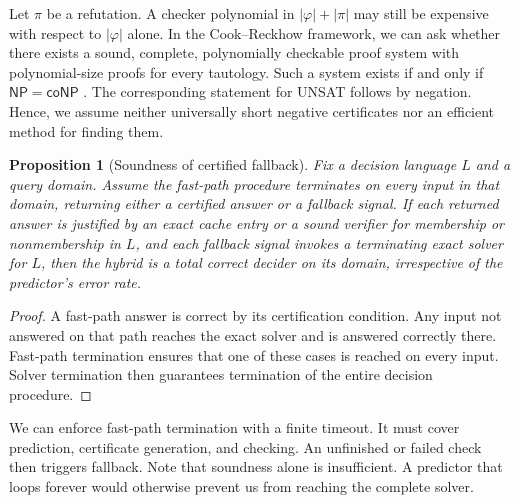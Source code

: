 \documentclass[11pt,a4paper]{article}
\numberwithin{equation}{section}
\newcommand{\NPclass}{\mathsf{NP}}
\newcommand{\coNP}{\mathsf{coNP}}
\theoremstyle{plain}
\newtheorem{proposition}[lemma]{Proposition}
\theoremstyle{definition}
\theoremstyle{remark}
\begin{document}
Let $\pi$ be a refutation. A checker polynomial in $|\varphi|+|\pi|$ may still be expensive with respect to $|\varphi|$ alone. In the Cook--Reckhow framework, we can ask whether there exists a sound, complete, polynomially checkable proof system with polynomial-size proofs for every tautology. Such a system exists if and only if $\NPclass=\coNP$ \citep{cook1979}. The corresponding statement for UNSAT follows by negation. Hence, we assume neither universally short negative certificates nor an efficient method for finding them.

\begin{proposition}[Soundness of certified fallback]
\label{prop:soundness}
Fix a decision language $L$ and a query domain. Assume the fast-path procedure terminates on every input in that domain, returning either a certified answer or a fallback signal. If each returned answer is justified by an exact cache entry or a sound verifier for membership or nonmembership in $L$, and each fallback signal invokes a terminating exact solver for $L$, then the hybrid is a total correct decider on its domain, irrespective of the predictor's error rate.
\end{proposition}

\begin{proof}
A fast-path answer is correct by its certification condition. Any input not answered on that path reaches the exact solver and is answered correctly there. Fast-path termination ensures that one of these cases is reached on every input. Solver termination then guarantees termination of the entire decision procedure.
\end{proof}

We can enforce fast-path termination with a finite timeout. It must cover prediction, certificate generation, and checking. An unfinished or failed check then triggers fallback. Note that soundness alone is insufficient. A predictor that loops forever would otherwise prevent us from reaching the complete solver.
\end{document}
